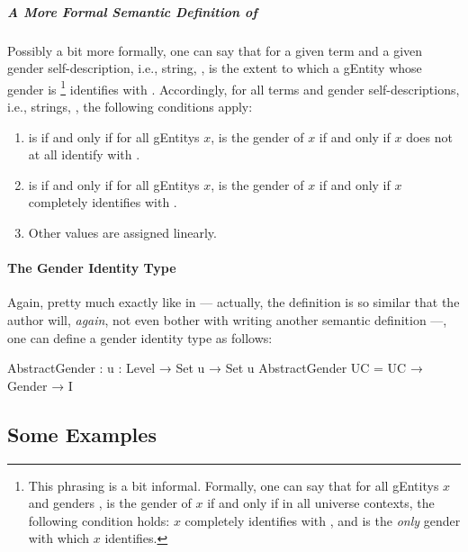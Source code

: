 \documentclass{article}
\theoremstyle{remark}
\begin{document}
\subparagraph{A More Formal Semantic Definition of }
Possibly a bit more formally, one can say that for a given  term  and a given gender self-description, i.e., string, ,   is the extent to which a \gls{gEntity} whose gender is \footnote{This phrasing is a bit informal.  Formally, one can say that for all \glspl{gEntity} \(x\) and genders ,  is the gender of \(x\) if and only if in all universe contexts, the following condition holds: \(x\) completely identifies with , and  is the \emph{only} gender with which \(x\) identifies.} identifies with .  Accordingly, for all  terms  and gender self-descriptions, i.e., strings, , the following conditions apply:

\begin{enumerate}
  \item {}   is  if and only if for all \glspl{gEntity} \(x\),  is the gender of \(x\) if and only if \(x\) does not at all identify with .
  \item {}   is  if and only if for all \glspl{gEntity} \(x\),  is the gender of \(x\) if and only if \(x\) completely identifies with .
  \item Other values are assigned linearly.
\end{enumerate}

\paragraph{The Gender Identity Type}
Again, pretty much exactly like in  --- actually, the definition is so similar that the author will, \emph{again}, not even bother with writing another semantic definition ---, one can define a gender identity type  as follows:

\begin{code}
  AbstractGender : {u : Level} → Set u → Set u
  AbstractGender UC = UC → Gender → I
\end{code}

\subsection{Some Examples}
\end{document}
